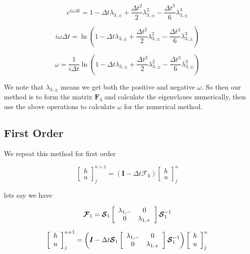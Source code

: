 \documentclass[12pt]{article}
\begin{document}
\[e^{i\omega\Delta t} = 1 - \Delta t \lambda_{3,\pm} + \frac{\Delta t^2}{2} \lambda_{3,\pm}^2 - \frac{\Delta t^3}{6} \lambda_{3,\pm}^3 \]

\[i\omega\Delta t =  \ln \left(1 - \Delta t \lambda_{3,\pm} + \frac{\Delta t^2}{2} \lambda_{3,\pm}^2 - \frac{\Delta t^3}{6} \lambda_{3,\pm}^3\right) \]

\[\omega = \frac{1}{i \Delta t} \ln \left(1 - \Delta t \lambda_{3,\pm} + \frac{\Delta t^2}{2} \lambda_{3,\pm}^2 - \frac{\Delta t^3}{6} \lambda_{3,\pm}^3\right) \]

We note that $\lambda_{3,\pm}$ means we get both the positive and negative $\omega$. So then our method is to form the matrix $\boldsymbol{F}_3$ and calculate the eigenvlaues numerically, then use the above operations to calculate $\omega$ for the numerical method. 

\subsection{First Order}
We repeat this method for first order

\[\left[\begin{array}{c}
h \\ u
\end{array}\right]^{n+1}_j = \left(\boldsymbol{I} - \Delta t\boldsymbol{\mathcal{F}_1} \right)\left[\begin{array}{c}
h \\ u
\end{array}\right]^{n}_j  \]



lets say we have 

\[\boldsymbol{\mathcal{F}}_1 = \boldsymbol{\mathcal{S}}_1 \left[\begin{array}{c c}
\lambda_{1,-}  & 0 \\0  & \lambda_{1,+}
\end{array}\right] \boldsymbol{\mathcal{S}}_1^{-1}  \]


\[\left[\begin{array}{c}
h \\ u
\end{array}\right]^{n+1}_j = \left(\boldsymbol{I} - \Delta t\boldsymbol{\mathcal{S}}_1 \left[\begin{array}{c c}
\lambda_{1,-}  & 0 \\0  & \lambda_{1,+}
\end{array}\right] \boldsymbol{\mathcal{S}}_1^{-1} \right)\left[\begin{array}{c}
h \\ u
\end{array}\right]^{n}_j  \]
\end{document}
